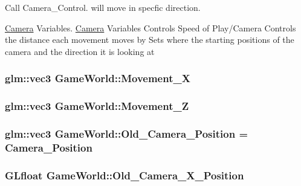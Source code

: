 Call Camera\+\_\+\+Control. will move in specfic direction. 

\hyperlink{class_camera}{Camera} Variables. \hyperlink{class_camera}{Camera} Variables Controls Speed of Play/\+Camera Controls the distance each movement moves by Sets where the starting positions of the camera and the direction it is looking at \hypertarget{class_game_world_a968eb29424b68f7cd79a5896c62e944d}{}
\subsubsection[{Movement\+\_\+\+X}]{\setlength{\rightskip}{0pt plus 5cm}glm\+::vec3 Game\+World\+::\+Movement\+\_\+\+X}\label{class_game_world_a968eb29424b68f7cd79a5896c62e944d}
\hypertarget{class_game_world_a8dd30ba92e7fa9b9b05075e31d1e7dd8}{}
\subsubsection[{Movement\+\_\+\+Z}]{\setlength{\rightskip}{0pt plus 5cm}glm\+::vec3 Game\+World\+::\+Movement\+\_\+\+Z}\label{class_game_world_a8dd30ba92e7fa9b9b05075e31d1e7dd8}
\hypertarget{class_game_world_ade0aa1baaba6ac54674638cef313c0bb}{}
\subsubsection[{Old\+\_\+\+Camera\+\_\+\+Position}]{\setlength{\rightskip}{0pt plus 5cm}glm\+::vec3 Game\+World\+::\+Old\+\_\+\+Camera\+\_\+\+Position = {\bf Camera\+\_\+\+Position}}\label{class_game_world_ade0aa1baaba6ac54674638cef313c0bb}
\hypertarget{class_game_world_a734c19bd480aef2a7af005e170d3d523}{}
\subsubsection[{Old\+\_\+\+Camera\+\_\+\+X\+\_\+\+Position}]{\setlength{\rightskip}{0pt plus 5cm}G\+Lfloat Game\+World\+::\+Old\+\_\+\+Camera\+\_\+\+X\+\_\+\+Position}\label{class_game_world_a734c19bd480aef2a7af005e170d3d523}
\hypertarget{class_game_world_ac1c9de2db7cb175f7a039a9f825190fc}{}
